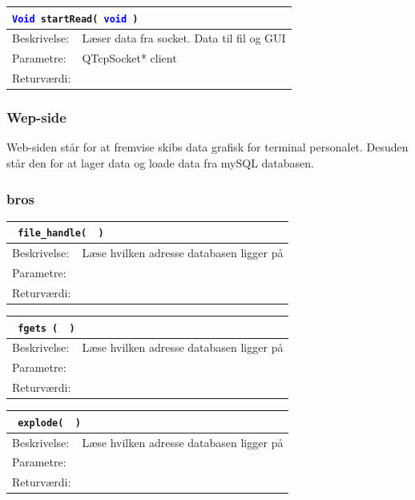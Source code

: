 \begin{table}[H]
\begin{tabular}{l p{12.5cm}}
\multicolumn{2}{l}{\texttt{\textcolor{blue}{Void} startRead( \textcolor{blue}{void} )}} \\
\hline
Beskrivelse:&Læser data fra socket. Data til fil og GUI\\
Parametre:&QTcpSocket* client\\
Returværdi:&\\
\end{tabular}
\end{table}

\subsubsection{Wep-side}
Web-siden står for at fremvise skibs data grafisk for terminal personalet. Desuden står den for at lager data og loade data fra mySQL databasen.\\

\subsubsection{bros}

\begin{table}[H]
\begin{tabular}{l p{12.5cm}}
\multicolumn{2}{l}{\texttt{\textcolor{blue}{} file\_handle( \textcolor{blue}{} )}} \\
\hline
Beskrivelse:&Læse hvilken adresse databasen ligger på\\
Parametre:&\\
Returværdi:&\\
\end{tabular}
\end{table}

\begin{table}[H]
\begin{tabular}{l p{12.5cm}}
\multicolumn{2}{l}{\texttt{\textcolor{blue}{} fgets ( \textcolor{blue}{} )}} \\
\hline
Beskrivelse:&Læse hvilken adresse databasen ligger på\\
Parametre:&\\
Returværdi:&\\
\end{tabular}
\end{table}

\begin{table}[H]
\begin{tabular}{l p{12.5cm}}
\multicolumn{2}{l}{\texttt{\textcolor{blue}{} explode( \textcolor{blue}{} )}} \\
\hline
Beskrivelse:&Læse hvilken adresse databasen ligger på\\
Parametre:&\\
Returværdi:&\\
\end{tabular}
\end{table}

